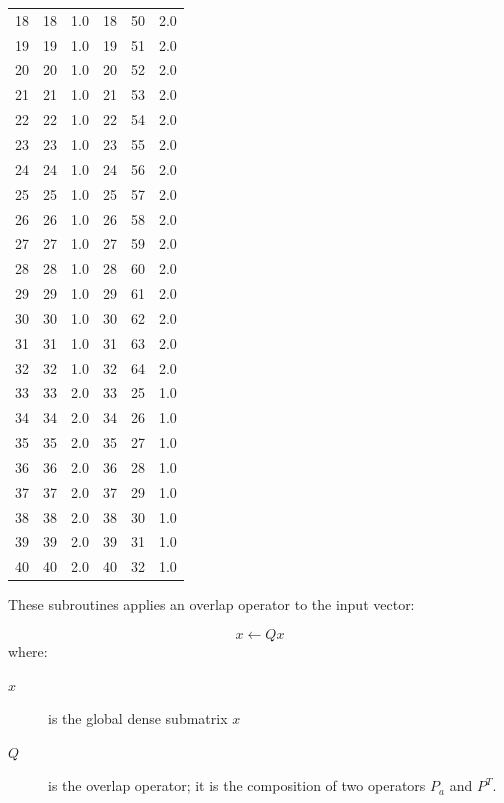 \begin{table}
\begin{center}
\begin{tabular}{rrr@{\hspace{6\tabcolsep}}rrr}
 18   &   18  &  1.0   &  18  &  50  &   2.0 \\
 19   &   19  &  1.0   &  19  &  51  &   2.0 \\
 20   &   20  &  1.0   &  20  &  52  &   2.0 \\ 
21   &   21  &  1.0   &  21  &  53  &   2.0 \\
22   &   22  &  1.0   &  22  &  54  &   2.0 \\
23   &   23  &  1.0   &  23  &  55  &   2.0 \\
24   &   24  &  1.0   &  24  &  56  &   2.0 \\
25   &   25  &  1.0   &  25  &  57  &   2.0 \\
26   &   26  &  1.0   &  26  &  58  &   2.0 \\
27   &   27  &  1.0   &  27  &  59  &   2.0 \\
28   &   28  &  1.0   &  28  &  60  &   2.0 \\
29   &   29  &  1.0   &  29  &  61  &   2.0 \\
30   &   30  &  1.0   &  30  &  62  &   2.0 \\
31   &   31  &  1.0   &  31  &  63  &   2.0 \\
32   &   32  &  1.0   &  32  &  64  &   2.0 \\
33   &   33  &  2.0   &  33  &  25  &   1.0 \\
34   &   34  &  2.0   &  34  &  26  &   1.0 \\
35   &   35  &  2.0   &  35  &  27  &   1.0 \\
36   &   36  &  2.0   &  36  &  28  &   1.0 \\
37   &   37  &  2.0   &  37  &  29  &   1.0 \\
38   &   38  &  2.0   &  38  &  30  &   1.0 \\
39   &   39  &  2.0   &  39  &  31  &   1.0 \\
40   &   40  &  2.0   &  40  &  32  &   1.0 \\
\end{tabular}
\end{center}
\end{table}

%
%



These subroutines applies an overlap operator to the input vector:

\[ x \leftarrow Q x \]
where:
\begin{description}
\item[$x$] is the global dense submatrix $x$
\item[$Q$] is the overlap operator; it is the composition of two
operators $ P_a$ and $ P^{T}$. 
\end{description}

